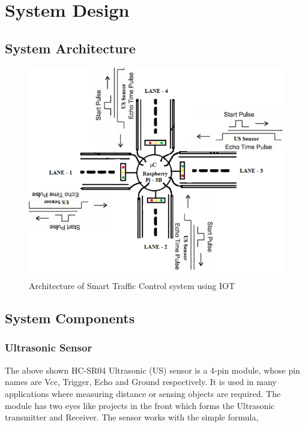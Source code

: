 \chapter{System Design}
\section{System Architecture}

\begin{figure}[h]\centering
\includegraphics[width=5in]{./images/SystemArchitecture.png}
\caption{Architecture of Smart Traffic Control system using IOT}\label{design}
\end{figure}

\section{System Components}
\subsection{Ultrasonic Sensor}

The above shown HC-SR04 Ultrasonic (US) sensor is a 4-pin module, whose pin names are Vcc, Trigger, Echo and Ground respectively. It is used in many applications where measuring distance or sensing objects are required. The module has two eyes like projects in the front which forms the Ultrasonic transmitter and Receiver. The sensor works with the simple formula,

